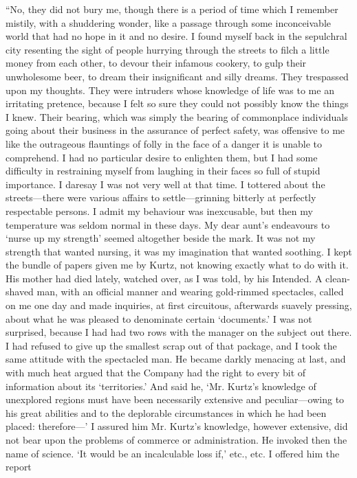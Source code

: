 \documentclass[12pt]{report}
\begin{document}
``No, they did not bury me, though there is a period of time which I
remember mistily, with a shuddering wonder, like a passage through some
inconceivable world that had no hope in it and no desire. I found myself
back in the sepulchral city resenting the sight of people hurrying
through the streets to filch a little money from each other, to devour
their infamous cookery, to gulp their unwholesome beer, to dream their
insignificant and silly dreams. They trespassed upon my thoughts. They
were intruders whose knowledge of life was to me an irritating pretence,
because I felt so sure they could not possibly know the things I knew.
Their bearing, which was simply the bearing of commonplace individuals
going about their business in the assurance of perfect safety, was
offensive to me like the outrageous flauntings of folly in the face of a
danger it is unable to comprehend. I had no particular desire to
enlighten them, but I had some difficulty in restraining myself from
laughing in their faces so full of stupid importance. I daresay I was
not very well at that time. I tottered about the streets---there were
various affairs to settle---grinning bitterly at perfectly respectable
persons. I admit my behaviour was inexcusable, but then my temperature
was seldom normal in these days. My dear aunt's endeavours to `nurse up
my strength' seemed altogether beside the mark. It was not my strength
that wanted nursing, it was my imagination that wanted soothing. I kept
the bundle of papers given me by Kurtz, not knowing exactly what to do
with it. His mother had died lately, watched over, as I was told, by his
Intended. A clean-shaved man, with an official manner and wearing
gold-rimmed spectacles, called on me one day and made inquiries, at
first circuitous, afterwards suavely pressing, about what he was pleased
to denominate certain `documents.' I was not surprised, because I had
had two rows with the manager on the subject out there. I had refused to
give up the smallest scrap out of that package, and I took the same
attitude with the spectacled man. He became darkly menacing at last, and
with much heat argued that the Company had the right to every bit of
information about its `territories.' And said he, `Mr. Kurtz's knowledge
of unexplored regions must have been necessarily extensive and
peculiar---owing to his great abilities and to the deplorable
circumstances in which he had been placed: therefore---' I assured him
Mr. Kurtz's knowledge, however extensive, did not bear upon the problems
of commerce or administration. He invoked then the name of science. `It
would be an incalculable loss if,' etc., etc. I offered him the report
\end{document}
